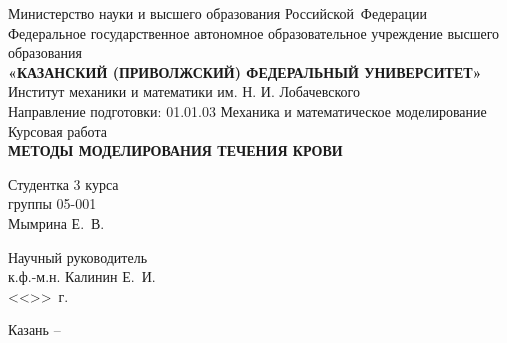 \begin{titlepage}
\begin{center}

\hfill \break

\large{Министерство науки и высшего образования Российской~Федерации}\\
\footnotesize{Федеральное государственное автономное образовательное учреждение высшего образования}\\ 
\small{\textbf{«КАЗАНСКИЙ (ПРИВОЛЖСКИЙ) ФЕДЕРАЛЬНЫЙ УНИВЕРСИТЕТ»}}\\

\hfill \break
\normalsize{Институт механики и математики им. Н. И. Лобачевского}\\

\hfill \break
\normalsize{Направление подготовки: 01.01.03 Механика и математическое моделирование}\\

\vspace{25mm}
\large{Курсовая работа}\\
\large{\textbf{МЕТОДЫ МОДЕЛИРОВАНИЯ ТЕЧЕНИЯ КРОВИ}}\\
\end{center}

\vspace{20mm}
\noindent
Студентка 3 курса \\
группы 05-001 \\
Мымрина Е.~В.

\hfill \break
Научный руководитель \\
к.ф.-м.н. Калинин Е.~И. \\
<<\underline{\hspace{0,75cm}}>>\underline{\hspace{2cm}}\the\year~г.

\vspace{\fill}

\begin{center}
    Казань -- \the\year
\end{center}
\thispagestyle{empty}

\end{titlepage}
